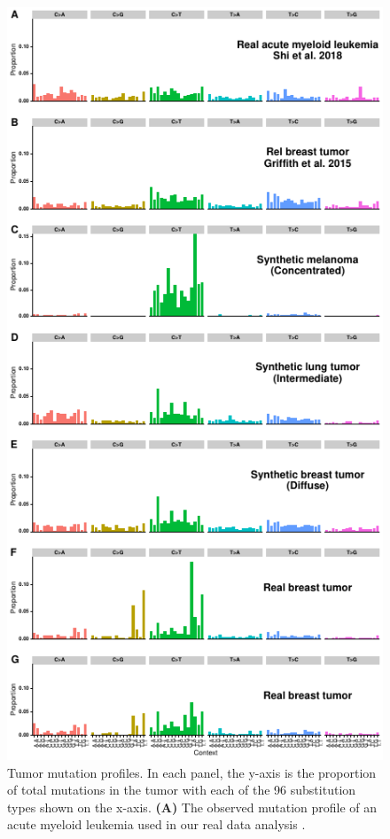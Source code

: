 \documentclass[a4,center,fleqn]{NAR}
\begin{document}
\begin{figure}
  \begin{center}
  \includegraphics{figures/signatures_only.pdf}
  \end{center}
  \caption{Tumor mutation profiles.
  In each panel, the y-axis is the proportion of total mutations in the tumor with each of the 96 substitution types shown on the x-axis.
  \textbf{(A)} The observed mutation profile of an acute myeloid leukemia used in our real data analysis \cite{Griffith2015}.
}
\end{figure}
\end{document}

